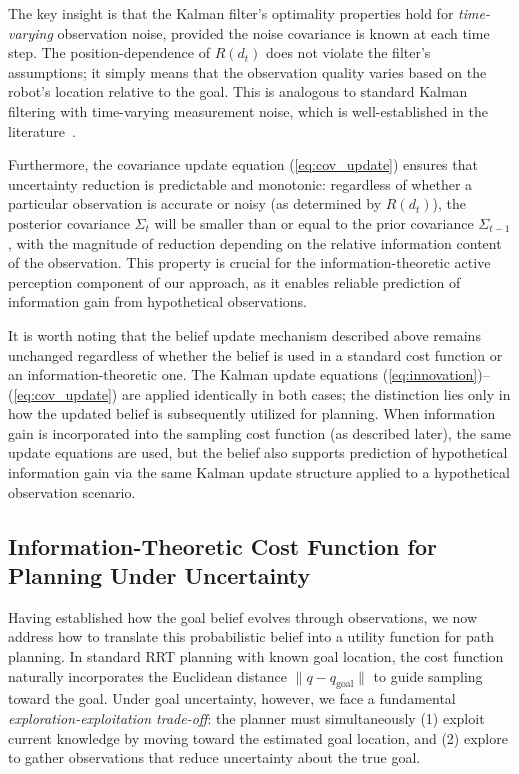 The key insight is that the Kalman filter's optimality properties hold for \emph{time-varying} observation noise, provided the noise covariance is known at each time step. The position-dependence of $R(d_t)$ does not violate the filter's assumptions; it simply means that the observation quality varies based on the robot's location relative to the goal. This is analogous to standard Kalman filtering with time-varying measurement noise, which is well-established in the literature~\cite{kalman1960}.

Furthermore, the covariance update equation (\ref{eq:cov_update}) ensures that uncertainty reduction is predictable and monotonic: regardless of whether a particular observation is accurate or noisy (as determined by $R(d_t)$), the posterior covariance $\Sigma_t$ will be smaller than or equal to the prior covariance $\Sigma_{t-1}$, with the magnitude of reduction depending on the relative information content of the observation. This property is crucial for the information-theoretic active perception component of our approach, as it enables reliable prediction of information gain from hypothetical observations.

It is worth noting that the belief update mechanism described above remains unchanged regardless of whether the belief is used in a standard cost function or an information-theoretic one. The Kalman update equations (\ref{eq:innovation})--(\ref{eq:cov_update}) are applied identically in both cases; the distinction lies only in how the updated belief is subsequently utilized for planning. When information gain is incorporated into the sampling cost function (as described later), the same update equations are used, but the belief also supports prediction of hypothetical information gain via the same Kalman update structure applied to a hypothetical observation scenario.

\subsection{Information-Theoretic Cost Function for Planning Under Uncertainty}

Having established how the goal belief evolves through observations, we now address how to translate this probabilistic belief into a utility function for path planning. In standard RRT planning with known goal location, the cost function naturally incorporates the Euclidean distance $\|q - q_{\text{goal}}\|$ to guide sampling toward the goal. Under goal uncertainty, however, we face a fundamental \emph{exploration-exploitation trade-off}: the planner must simultaneously (1) exploit current knowledge by moving toward the estimated goal location, and (2) explore to gather observations that reduce uncertainty about the true goal.

